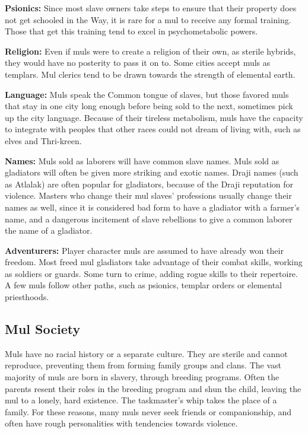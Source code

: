 \textbf{Psionics:} Since most slave owners take steps to ensure that their property does not get schooled in the Way, it is rare for a mul to receive any formal training. Those that get this training tend to excel in psychometabolic powers.

\textbf{Religion:} Even if muls were to create a religion of their own, as sterile hybrids, they would have no posterity to pass it on to. Some cities accept muls as templars. Mul clerics tend to be drawn towards the strength of elemental earth.

\textbf{Language:} Muls speak the Common tongue of slaves, but those favored muls that stay in one city long enough before being sold to the next, sometimes pick up the city language. Because of their tireless metabolism, muls have the capacity to integrate with peoples that other races could not dream of living with, such as elves and Thri-kreen.

\textbf{Names:} Muls sold as laborers will have common slave names. Muls sold as gladiators will often be given more striking and exotic names. Draji names (such as Atlalak) are often popular for gladiators, because of the Draji reputation for violence. Masters who change their mul slaves' professions usually change their names as well, since it is considered bad form to have a gladiator with a farmer's name, and a dangerous incitement of slave rebellions to give a common laborer the name of a gladiator.

\textbf{Adventurers:} Player character muls are assumed to have already won their freedom. Most freed mul gladiators take advantage of their combat skills, working as soldiers or guards. Some turn to crime, adding rogue skills to their repertoire. A few muls follow other paths, such as psionics, templar orders or elemental priesthoods.

\subsection{Mul Society}
Muls have no racial history or a separate culture. They are sterile and cannot reproduce, preventing them from forming family groups and clans. The vast majority of muls are born in slavery, through breeding programs. Often the parents resent their roles in the breeding program and shun the child, leaving the mul to a lonely, hard existence. The taskmaster's whip takes the place of a family. For these reasons, many muls never seek friends or companionship, and often have rough personalities with tendencies towards violence.

